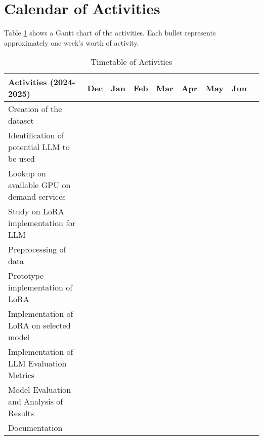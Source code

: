 \section{Calendar of Activities}

	Table \ref{tab:timetableactivities} shows a Gantt chart of the activities.  Each bullet represents approximately
	one week's worth of activity.
	
	\newcommand{\weekone}{\textbullet}
	\newcommand{\weektwo}{\textbullet \textbullet}
	\newcommand{\weekthree}{\textbullet \textbullet \textbullet}
	\newcommand{\weekfour}{\textbullet \textbullet \textbullet \textbullet}
	
	
	\begin{table}[ht]  
		\centering
		\caption{Timetable of Activities} \vspace{0.25em}
		\begin{tabular}{|p{2in}|c|c|c|c|c|c|c|c|} \hline
			\centering Activities (2024-2025) 
			& Dec & Jan & Feb & Mar & Apr & May & Jun \\ \hline
			
			Creation of the dataset      
			&\weekone~~~ & & & & & &  \\ \hline
			
			Identification of potential LLM to be used 
			&\weekone~~~ & & & &  &  &  \\ \hline
			
			Lookup on available GPU on demand services     
			&\weekone~~~ & & & &  & &   \\ \hline
			
			Study on LoRA implementation for LLM     
			& ~\weekone & & & &  &  &  \\ \hline
			
			Preprocessing of data      
			& ~\weekthree & & & &  & &  \\ \hline
			
			Prototype implementation of LoRA 
			&~~~\weekone & \weekfour & & &  & &   \\ \hline
			
			Implementation of LoRA on selected model 
			& & &\weektwo~~ & &  &  &  \\ \hline
			
			Implementation of LLM Evaluation Metrics 
			& & &\weektwo  & &  &  &  \\ \hline
			
			Model Evaluation and Analysis of Results 
			& & & & \weekfour & &  &   \\ \hline
			
			Documentation 
			& ~~\weektwo  & \weekfour & \weekfour & \weekfour & \weekfour & &  \\ \hline
			
		\end{tabular}
		\label{tab:timetableactivities}
	\end{table}
